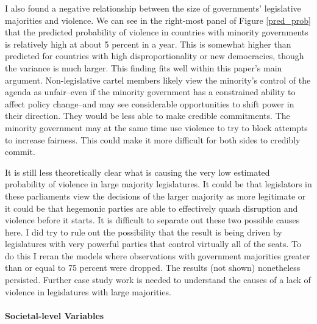 \documentclass[a4paper]{article}\usepackage[]{graphicx}\usepackage[]{color}
\begin{document}
I also found a negative relationship between the size of governments' legislative majorities and violence. We can see in the right-most panel of Figure \ref{pred_prob} that the predicted probability of violence in countries with minority governments is relatively high at about 5 percent in a year. This is somewhat higher than predicted for countries with high disproportionality or new democracies, though the variance is much larger. This finding fits well within this paper's main argument. Non-legislative cartel members likely view the minority's control of the agenda as unfair--even if the minority government has a constrained ability to affect policy change--and may see considerable opportunities to shift power in their direction. They would be less able to make credible commitments. The minority government may at the same time use violence to try to block attempts to increase fairness. This could make it more difficult for both sides to credibly commit.

It is still less theoretically clear what is causing the very low estimated probability of violence in large majority legislatures. It could be that legislators in these parliaments view the decisions of the larger majority as more legitimate or it could be that hegemonic parties are able to effectively quash disruption and violence before it starts. It is difficult to separate out these two possible causes here. I did try to rule out the possibility that the result is being driven by legislatures with very powerful parties that control virtually all of the seats. To do this I reran the models where observations with government majorities greater than or equal to 75 percent were dropped. The results (not shown) nonetheless persisted. Further case study work is needed to understand the causes of a lack of violence in legislatures with large majorities.

\paragraph{Societal-level Variables}
\end{document}

